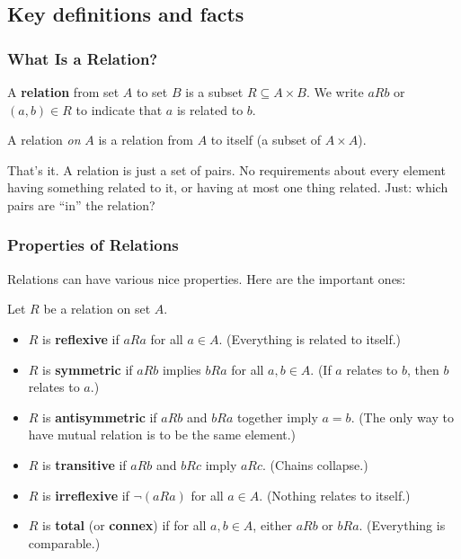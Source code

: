 \subsection*{Key definitions and facts}

\subsubsection*{What Is a Relation?}

\begin{definition}[Relation]
A \textbf{relation} from set $A$ to set $B$ is a subset $R \subseteq A \times B$. We write $aRb$ or $(a,b) \in R$ to indicate that $a$ is related to $b$.

A relation \emph{on} $A$ is a relation from $A$ to itself (a subset of $A \times A$).
\end{definition}

That's it. A relation is just a set of pairs. No requirements about every element having something related to it, or having at most one thing related. Just: which pairs are ``in'' the relation?

\subsubsection*{Properties of Relations}

Relations can have various nice properties. Here are the important ones:

\begin{definition}
Let $R$ be a relation on set $A$.
\begin{itemize}
  \item $R$ is \textbf{reflexive} if $aRa$ for all $a \in A$. (Everything is related to itself.)
  \item $R$ is \textbf{symmetric} if $aRb$ implies $bRa$ for all $a,b \in A$. (If $a$ relates to $b$, then $b$ relates to $a$.)
  \item $R$ is \textbf{antisymmetric} if $aRb$ and $bRa$ together imply $a = b$. (The only way to have mutual relation is to be the same element.)
  \item $R$ is \textbf{transitive} if $aRb$ and $bRc$ imply $aRc$. (Chains collapse.)
  \item $R$ is \textbf{irreflexive} if $\neg(aRa)$ for all $a \in A$. (Nothing relates to itself.)
  \item $R$ is \textbf{total} (or \textbf{connex}) if for all $a,b \in A$, either $aRb$ or $bRa$. (Everything is comparable.)
\end{itemize}
\end{definition}

